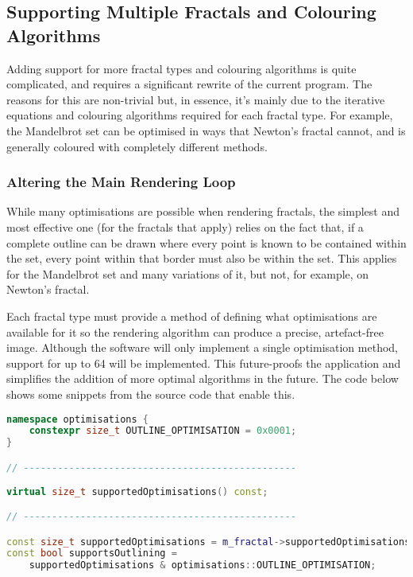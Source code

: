 \subsection{Supporting Multiple Fractals and Colouring Algorithms}

Adding support for more fractal types and colouring algorithms is quite complicated, and requires a significant rewrite of the current program. The reasons for this are non-trivial but, in essence, it's mainly due to the iterative equations and colouring algorithms required for each fractal type. For example, the Mandelbrot set can be optimised in ways that Newton's fractal cannot, and is generally coloured with completely different methods.

\subsubsection{Altering the Main Rendering Loop}

While many optimisations are possible when rendering fractals, the simplest and most effective one (for the fractals that apply) relies on the fact that, if a complete outline can be drawn where every point is known to be contained within the set, every point within that border must also be within the set. This applies for the Mandelbrot set and many variations of it, but not, for example, on Newton's fractal.

Each fractal type must provide a method of defining what optimisations are available for it so the rendering algorithm can produce a precise, artefact-free image. Although the software will only implement a single optimisation method, support for up to 64 will be implemented. This future-proofs the application and simplifies the addition of more optimal algorithms in the future. The code below shows some snippets from the source code that enable this.

\begin{lstlisting}[language=c++]
namespace optimisations {
	constexpr size_t OUTLINE_OPTIMISATION = 0x0001;
}

// ------------------------------------------------
	
virtual size_t supportedOptimisations() const;

// ------------------------------------------------

const size_t supportedOptimisations = m_fractal->supportedOptimisations();
const bool supportsOutlining =
	supportedOptimisations & optimisations::OUTLINE_OPTIMISATION;
\end{lstlisting}

